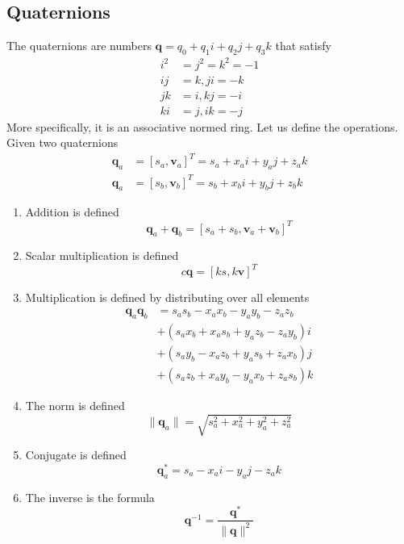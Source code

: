 \documentclass{article}
\begin{document}
  \subsection{Quaternions}

  The quaternions are numbers $\mathbf{q} = q_0 + q_1 i + q_2 j + q_3 k$ that satisfy 
  \begin{align*}
      i^2 &= j^2 = k^2 = -1 \\
      ij &= k, ji = -k \\
      jk &= i, kj = -i \\
      ki &= j, ik = -j 
  \end{align*}
  More specifically, it is an associative normed ring. Let us define the operations. Given two quaternions 
  \begin{align*}
      \mathbf{q}_a & = [s_a, \mathbf{v}_a]^T = s_a + x_a i + y_a j + z_a k \\
      \mathbf{q}_a & = [s_b, \mathbf{v}_b]^T = s_b + x_b i + y_b j + z_b k 
  \end{align*}
  \begin{enumerate}
      \item Addition is defined 
      \begin{equation}
        \mathbf{q}_a + \mathbf{q}_b = [s_a + s_b, \mathbf{v}_a + \mathbf{v}_b]^T
      \end{equation}
      
      \item Scalar multiplication is defined 
      \begin{equation}
        c \mathbf{q}= [k s, k\mathbf{v}]^T
      \end{equation}
      
      \item Multiplication is defined by distributing over all elements
      \begin{align*}
      \mathbf{q}_a \mathbf{q}_b & = s_a s_b - x_a x_b - y_a y_b - z_a z_b \\
      & + (s_a x_b + x_a s_b + y_a z_b - z_a y_b) i \\
      & + (s_a y_b - x_a z_b + y_a s_b + z_a x_b) j \\
      & + (s_a z_b + x_a y_b - y_a x_b + z_a s_b) k 
      \end{align*}
      
      \item The norm is defined 
      \begin{equation}
        \|\mathbf{q}_a \| = \sqrt{s_a^2 + x_a^2 + y_a^2 + z_a^2}
      \end{equation}
      
      \item Conjugate is defined 
      \begin{equation}
        \mathbf{q}_a^{*} = s_a - x_a i - y_a j - z_a k
      \end{equation}
      
      \item The inverse is the formula 
      \begin{equation}
        \mathbf{q}^{-1} = \frac{\mathbf{q}^*}{\|\mathbf{q}\|^2}
      \end{equation}
  \end{enumerate}
\end{document}
